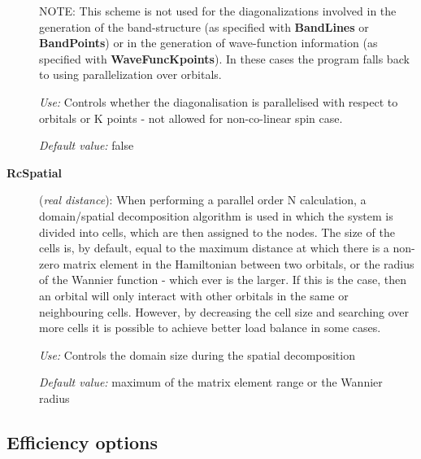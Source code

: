 \documentclass[11pt]{article}
\begin{document}
\begin{description}
NOTE: This scheme is not used for the diagonalizations involved in the
generation of the band-structure (as specified with {\bf BandLines} or
{\bf BandPoints}) or in the generation of wave-function information
(as specified with {\bf WaveFuncKpoints}). In these cases the program
falls back to using parallelization over orbitals.

{\it Use:} Controls whether the diagonalisation is parallelised with
respect to orbitals or K points - not allowed for non-co-linear spin
case.

{\it Default value:}  false

\item[{\bf RcSpatial}] ({\it real distance}):
When performing a parallel order N calculation, a domain/spatial
decomposition algorithm is used in which the system is divided into
cells, which are then assigned to the nodes. The size of the cells
is, by default, equal to the maximum distance at which there is a non-zero 
matrix element in the Hamiltonian between two orbitals, or the
radius of the Wannier function - which ever is the larger. If this is 
the case, then an orbital will only interact with other orbitals in the same
or neighbouring cells. However, by decreasing the cell size and searching
over more cells it is possible to achieve better load balance in some
cases.

{\it Use:} Controls the domain size during the spatial decomposition

{\it Default value:}  maximum of the matrix element range or the Wannier radius

\end{description}


\vspace{5pt}
\subsection{Efficiency options}
\end{document}
